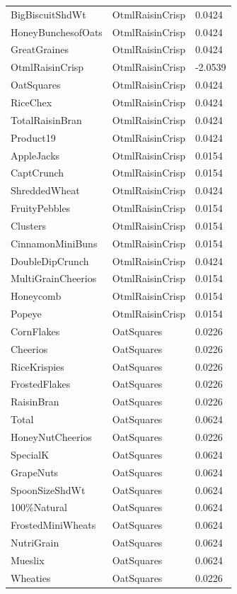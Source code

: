 \begin{table}[!htbp]
\begin{tabular}{lll}
BigBiscuitShdWt & OtmlRaisinCrisp & 0.0424
\\
HoneyBunchesofOats & OtmlRaisinCrisp & 0.0424
\\
GreatGraines & OtmlRaisinCrisp & 0.0424
\\
OtmlRaisinCrisp & OtmlRaisinCrisp & -2.0539
\\
OatSquares & OtmlRaisinCrisp & 0.0424
\\
RiceChex & OtmlRaisinCrisp & 0.0424
\\
TotalRaisinBran & OtmlRaisinCrisp & 0.0424
\\
Product19 & OtmlRaisinCrisp & 0.0424
\\
AppleJacks & OtmlRaisinCrisp & 0.0154
\\
CaptCrunch & OtmlRaisinCrisp & 0.0154
\\
ShreddedWheat & OtmlRaisinCrisp & 0.0424
\\
FruityPebbles & OtmlRaisinCrisp & 0.0154
\\
Clusters & OtmlRaisinCrisp & 0.0154
\\
CinnamonMiniBuns & OtmlRaisinCrisp & 0.0154
\\
DoubleDipCrunch & OtmlRaisinCrisp & 0.0424
\\
MultiGrainCheerios & OtmlRaisinCrisp & 0.0154
\\
Honeycomb & OtmlRaisinCrisp & 0.0154
\\
Popeye & OtmlRaisinCrisp & 0.0154
\\
CornFlakes & OatSquares & 0.0226
\\
Cheerios & OatSquares & 0.0226
\\
RiceKrispies & OatSquares & 0.0226
\\
FrostedFlakes & OatSquares & 0.0226
\\
RaisinBran & OatSquares & 0.0226
\\
Total & OatSquares & 0.0624
\\
HoneyNutCheerios & OatSquares & 0.0226
\\
SpecialK & OatSquares & 0.0624
\\
GrapeNuts & OatSquares & 0.0624
\\
SpoonSizeShdWt & OatSquares & 0.0624
\\
100\%Natural & OatSquares & 0.0624
\\
FrostedMiniWheats & OatSquares & 0.0624
\\
NutriGrain & OatSquares & 0.0624
\\
Mueslix & OatSquares & 0.0624
\\
Wheaties & OatSquares & 0.0226

\end{tabular}
\end{table}
